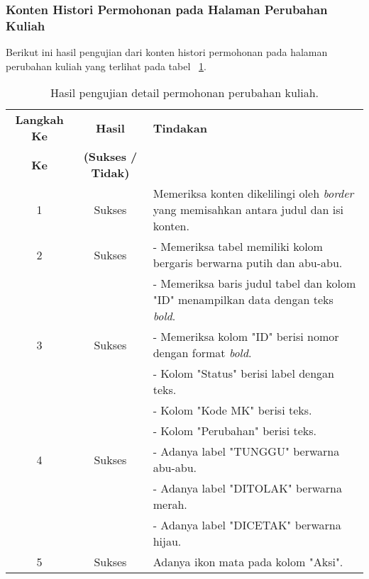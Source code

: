 \subsubsection{Konten Histori Permohonan pada Halaman Perubahan Kuliah}
Berikut ini hasil pengujian dari konten histori permohonan pada halaman perubahan kuliah yang terlihat pada tabel ~\ref{hasil:HistoriPermohonanPerubahanKuliah}.
\begin{table}[H]
	\centering 
	\caption{Hasil pengujian detail permohonan perubahan kuliah.}
	\label{hasil:HistoriPermohonanPerubahanKuliah}
		\begin{tabular}{|c| c| p{}|}
		\toprule
		\textbf{Langkah Ke} & \textbf{Hasil} & \textbf{Tindakan}\\
		\textbf{Ke} & \textbf{(Sukses / Tidak)} &\\
		\midrule
		1&Sukses&Memeriksa konten dikelilingi oleh \textit{border} yang memisahkan antara judul dan isi konten.\\
		\hline
		2&Sukses&- Memeriksa tabel memiliki kolom bergaris berwarna putih dan abu-abu.\\
		&&- Memeriksa baris judul tabel dan kolom "ID" menampilkan data dengan teks \textit{bold}.\\
		\hline
		3&Sukses& - Memeriksa kolom "ID" berisi nomor dengan format \textit{bold}.\\
		&& - Kolom "Status" berisi label dengan teks. \\
		&& - Kolom "Kode MK" berisi teks. \\
		&& - Kolom "Perubahan" berisi teks.\\
		\hline
		4&Sukses& - Adanya label "TUNGGU" berwarna abu-abu.\\
		&& - Adanya label "DITOLAK" berwarna merah.\\
		&& - Adanya label "DICETAK" berwarna hijau.\\
		\hline
		5&Sukses& Adanya ikon mata pada kolom "Aksi".\\		
		\bottomrule		
	\end{tabular} 
\end{table}

